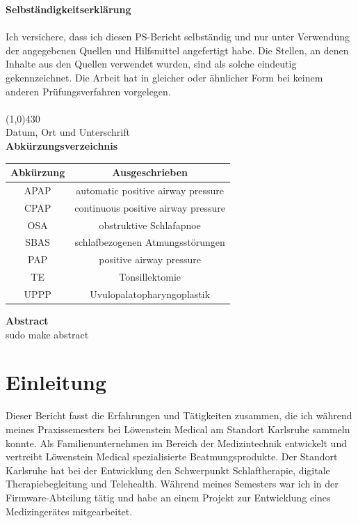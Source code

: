 \documentclass[a4paper, 12pt]{article}
\begin{document}
\newpage
{\bfseries \large Selbständigkeitserklärung}\\ \\
Ich versichere, dass ich diesen PS-Bericht selbständig und nur unter Verwendung der angegebenen
Quellen und Hilfsmittel angefertigt habe. Die Stellen, an denen Inhalte aus den Quellen verwendet
wurden, sind als solche eindeutig gekennzeichnet. Die Arbeit hat in gleicher oder ähnlicher Form bei
keinem anderen Prüfungsverfahren vorgelegen. \\
\vspace{1.0cm} \\
\line(1,0){430} \\
Datum, Ort und Unterschrift\\

\newpage
{\bfseries \large Abkürzungsverzeichnis}\\
\begin{table}[h!]
\centering
\begin{tabular}{c | c}
\hline
\textbf{Abkürzung} & \textbf{Ausgeschrieben} \\ 
\hline 
APAP & automatic positive airway pressure \\
CPAP & continuous positive airway pressure \\
OSA & obstruktive Schlafapnoe \\ 
SBAS & schlafbezogenen Atmungsstörungen \\ 
PAP & positive airway pressure \\
TE & Tonsillektomie \\
UPPP & Uvulopalatopharyngoplastik \\
\end{tabular} 
\end{table}

\newpage
{\bfseries \large Abstract}\\
sudo make abstract 

\newpage
\tableofcontents 

\newpage
\section{Einleitung}\label{Einleitung} 
Dieser Bericht fasst die Erfahrungen und Tätigkeiten zusammen, die ich während meines Praxissemesters bei Löwenstein Medical am Standort Karlsruhe sammeln konnte. Als Familienunternehmen im Bereich der Medizintechnik entwickelt und vertreibt Löwenstein Medical spezialisierte Beatmungsprodukte. Der Standort Karlsruhe hat bei der Entwicklung den Schwerpunkt Schlaftherapie, digitale Therapiebegleitung und Telehealth. Während meines Semesters war ich in der Firmware-Abteilung tätig und habe an einem Projekt zur Entwicklung eines Medizingerätes mitgearbeitet. 
\end{document}
